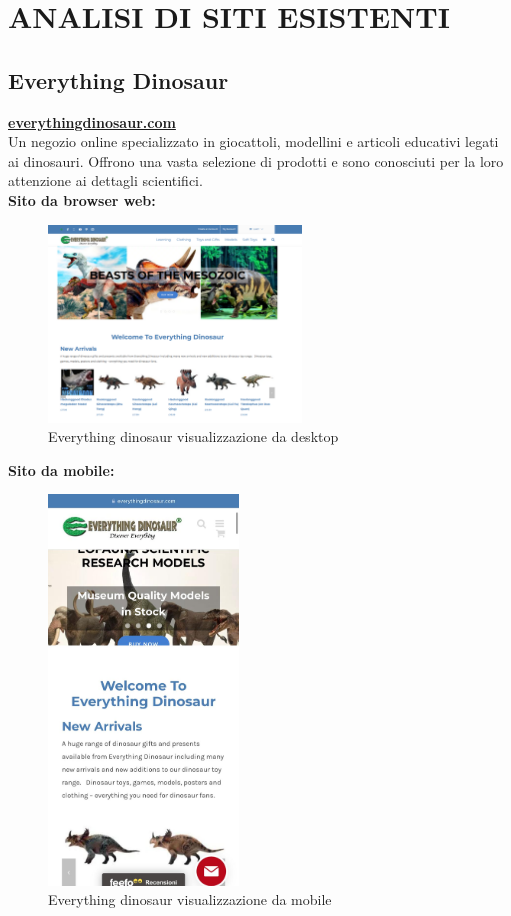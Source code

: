 \chapter{ANALISI DI SITI ESISTENTI}
\section{Everything Dinosaur}
\href{https://www.everythingdinosaur.com/}{\textbf{everythingdinosaur.com}}
\\
Un negozio online specializzato in giocattoli, modellini e articoli educativi legati ai dinosauri. Offrono una vasta selezione di prodotti e sono conosciuti per la loro attenzione ai dettagli scientifici.
\\
\textbf{Sito da browser web:}
\begin{figure}[H]
        \centering
        \includegraphics[width=0.60\textwidth]{immagini/everythingdinosaurpng.png}
        \caption{Everything dinosaur visualizzazione da desktop}
    \end{figure}
    
\textbf{Sito da mobile:}
\begin{figure}[H]
        \centering
        \includegraphics[width=0.45\textwidth]{immagini/everythingdinosaur_mobile.jpg}
        \caption{Everything dinosaur visualizzazione da mobile}
    \end{figure}

